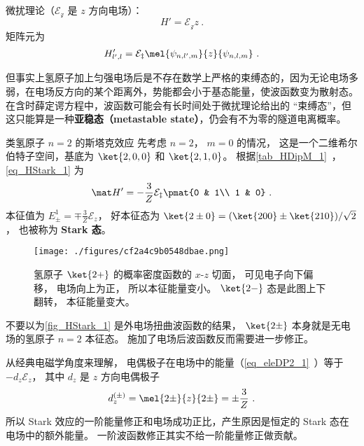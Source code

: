 
\begin{issues}
\issueTODO
\end{issues}


微扰理论（$\mathcal{E_z}$ 是 $z$ 方向电场）：
\begin{equation}
H' = \mathcal{E_z} z~.
\end{equation}
矩阵元为
\begin{equation}\label{eq_HStark_1}
H'_{l',l} = \mathcal{E_z}\mel{\psi_{n,l',m}}{z}{\psi_{n,l,m}}~.
\end{equation}

但事实上氢原子加上匀强电场后是不存在数学上严格的束缚态的，因为无论电场多弱，在电场反方向的某个距离外，势能都会小于基态能量，使波函数变为散射态。在含时薛定谔方程中，波函数可能会有长时间处于微扰理论给出的 “束缚态”，但这只能算是一种\textbf{亚稳态（metastable state）}，仍会有不为零的隧道电离概率。

\begin{example}{类氢原子 $n=2$ 的斯塔克效应}
先考虑 $n=2$， $m=0$ 的情况， 这是一个二维希尔伯特子空间，基底为 $\ket{2,0,0}$ 和 $\ket{2,1,0}$。 根据\autoref{tab_HDipM_1}~， \autoref{eq_HStark_1} 为
\begin{equation}
\mat H' = -\frac{3}{Z}\mathcal{E_z}\pmat{0 & 1\\ 1 & 0}~.
\end{equation}
本征值为 $E_{\pm}^1 = \mp \frac{3}{Z}\mathcal{E}_z$， 好本征态为 $\ket{2\pm 0} = (\ket{200} \pm \ket{210})/{\sqrt 2}$， 也被称为 \textbf{Stark 态}。

\begin{figure}[ht]
\centering
\texttt{[image: ./figures/cf2a4c9b0548dbae.png]}
\caption{氢原子 $\ket{2+}$ 的概率密度函数的 $x$-$z$ 切面， 可见电子向下偏移， 电场向上为正， 所以本征能量变小。 $\ket{2-}$ 态是此图上下翻转， 本征能量变大。} \label{fig_HStark_1}
\end{figure}

不要以为\autoref{fig_HStark_1} 是外电场扭曲波函数的结果， $\ket{2\pm}$ 本身就是无电场的氢原子 $n=2$ 本征态。 施加了电场后波函数反而需要进一步修正。

从经典电磁学角度来理解， 电偶极子在电场中的能量（\autoref{eq_eleDP2_1}~）等于 $-d_z \mathcal{E}_z$， 其中 $d_z$ 是 $z$ 方向电偶极子
\begin{equation}
d_z^{(\pm)} = \mel{2\pm}{z}{2\pm} = \pm \frac{3}{Z}~.
\end{equation}
所以 Stark 效应的一阶能量修正和电场成功正比，产生原因是恒定的 Stark 态在电场中的额外能量。 一阶波函数修正其实不给一阶能量修正做贡献。
\end{example}

